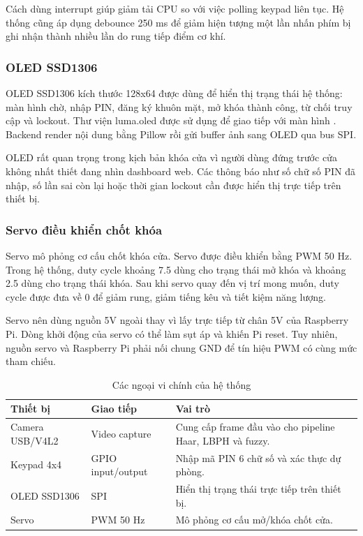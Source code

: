 Cách dùng interrupt giúp giảm tải CPU so với việc polling keypad liên tục. Hệ thống cũng áp dụng debounce 250 ms để giảm hiện tượng một lần nhấn phím bị ghi nhận thành nhiều lần do rung tiếp điểm cơ khí.

\subsubsection{OLED SSD1306}

OLED SSD1306 kích thước 128x64 được dùng để hiển thị trạng thái hệ thống: màn hình chờ, nhập PIN, đăng ký khuôn mặt, mở khóa thành công, từ chối truy cập và lockout. Thư viện luma.oled được sử dụng để giao tiếp với màn hình \cite{lumaoled}. Backend render nội dung bằng Pillow rồi gửi buffer ảnh sang OLED qua bus SPI.

OLED rất quan trọng trong kịch bản khóa cửa vì người dùng đứng trước cửa không nhất thiết đang nhìn dashboard web. Các thông báo như số chữ số PIN đã nhập, số lần sai còn lại hoặc thời gian lockout cần được hiển thị trực tiếp trên thiết bị.

\subsubsection{Servo điều khiển chốt khóa}

Servo mô phỏng cơ cấu chốt khóa cửa. Servo được điều khiển bằng PWM 50 Hz. Trong hệ thống, duty cycle khoảng 7.5 dùng cho trạng thái mở khóa và khoảng 2.5 dùng cho trạng thái khóa. Sau khi servo quay đến vị trí mong muốn, duty cycle được đưa về 0 để giảm rung, giảm tiếng kêu và tiết kiệm năng lượng.

Servo nên dùng nguồn 5V ngoài thay vì lấy trực tiếp từ chân 5V của Raspberry Pi. Dòng khởi động của servo có thể làm sụt áp và khiến Pi reset. Tuy nhiên, nguồn servo và Raspberry Pi phải nối chung GND để tín hiệu PWM có cùng mức tham chiếu.

\begin{table}[H]
\centering
\caption{Các ngoại vi chính của hệ thống}
\label{tab:hardware_theory}
\begin{tabular}{|l|l|p{6.7cm}|}
\hline
\textbf{Thiết bị} & \textbf{Giao tiếp} & \textbf{Vai trò} \\
\hline
Camera USB/V4L2 & Video capture & Cung cấp frame đầu vào cho pipeline Haar, LBPH và fuzzy. \\
\hline
Keypad 4x4 & GPIO input/output & Nhập mã PIN 6 chữ số và xác thực dự phòng. \\
\hline
OLED SSD1306 & SPI & Hiển thị trạng thái trực tiếp trên thiết bị. \\
\hline
Servo & PWM 50 Hz & Mô phỏng cơ cấu mở/khóa chốt cửa. \\
\hline
\end{tabular}
\end{table}
